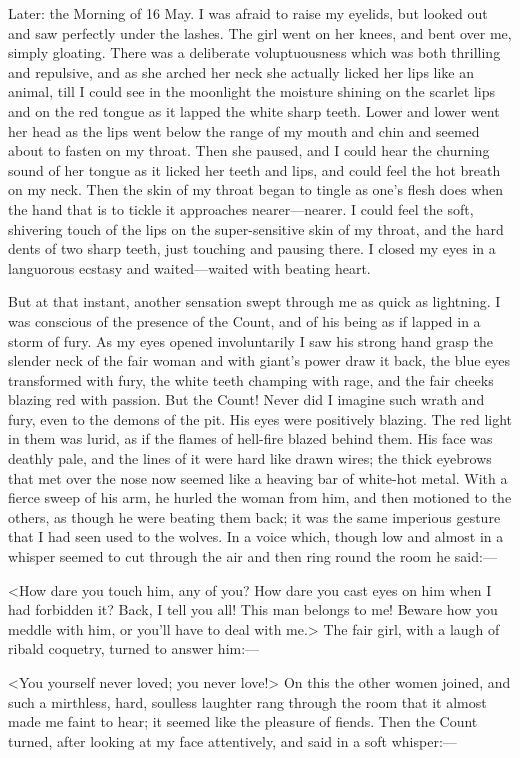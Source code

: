 \begin{diary}{Later: the Morning of 16 May.}
I was afraid to raise my eyelids, but looked out and saw perfectly under the lashes. The girl went on her knees, and bent over me, simply gloating. There was a deliberate voluptuousness which was both thrilling and repulsive, and as she arched her neck she actually licked her lips like an animal, till I could see in the moonlight the moisture shining on the scarlet lips and on the red tongue as it lapped the white sharp teeth. Lower and lower went her head as the lips went below the range of my mouth and chin and seemed about to fasten on my throat. Then she paused, and I could hear the churning sound of her tongue as it licked her teeth and lips, and could feel the hot breath on my neck. Then the skin of my throat began to tingle as one's flesh does when the hand that is to tickle it approaches nearer—nearer. I could feel the soft, shivering touch of the lips on the super-sensitive skin of my throat, and the hard dents of two sharp teeth, just touching and pausing there. I closed my eyes in a languorous ecstasy and waited—waited with beating heart.

But at that instant, another sensation swept through me as quick as lightning. I was conscious of the presence of the Count, and of his being as if lapped in a storm of fury. As my eyes opened involuntarily I saw his strong hand grasp the slender neck of the fair woman and with giant's power draw it back, the blue eyes transformed with fury, the white teeth champing with rage, and the fair cheeks blazing red with passion. But the Count! Never did I imagine such wrath and fury, even to the demons of the pit. His eyes were positively blazing. The red light in them was lurid, as if the flames of hell-fire blazed behind them. His face was deathly pale, and the lines of it were hard like drawn wires; the thick eyebrows that met over the nose now seemed like a heaving bar of white-hot metal. With a fierce sweep of his arm, he hurled the woman from him, and then motioned to the others, as though he were beating them back; it was the same imperious gesture that I had seen used to the wolves. In a voice which, though low and almost in a whisper seemed to cut through the air and then ring round the room he said:—

<How dare you touch him, any of you? How dare you cast eyes on him when I had forbidden it? Back, I tell you all! This man belongs to me! Beware how you meddle with him, or you'll have to deal with me.> The fair girl, with a laugh of ribald coquetry, turned to answer him:—

<You yourself never loved; you never love!> On this the other women joined, and such a mirthless, hard, soulless laughter rang through the room that it almost made me faint to hear; it seemed like the pleasure of fiends. Then the Count turned, after looking at my face attentively, and said in a soft whisper:—


\end{diary}
